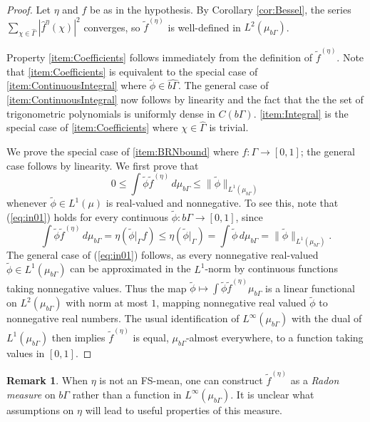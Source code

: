\documentclass[12pt]{amsart} \usepackage{amsmath,centernot,amssymb,leftindex}
\numberwithin{theorem}{section}
\numberwithin{equation}{section}
\theoremstyle{definition}
\newtheorem{remark}[theorem]{Remark}
\begin{document}
	\begin{proof} Let $\eta$ and $f$ be as in the hypothesis.  By
	  Corollary \ref{cor:Bessel}, the series $\sum_{\chi\in\widehat{\Gamma}}|\hat{f}^{\eta}(\chi)|^{2}$ converges, so  $\tilde{f}^{(\eta)}$ is well-defined in $L^{2}(\mu_{b\Gamma})$.	
	  
	  Property \ref{item:Coefficients} follows immediately from the definition of $\tilde{f}^{(\eta)}$. Note that \ref{item:Coefficients} is equivalent to the special case of \ref{item:ContinuousIntegral} where $\tilde{\phi}\in \widehat{b\Gamma}$.  The general case of \ref{item:ContinuousIntegral} now follows by linearity and the fact that the the set of trigonometric polynomials is uniformly dense in $C(b\Gamma)$.  \ref{item:Integral} is the special case of \ref{item:Coefficients} where $\chi\in \widehat{\Gamma}$ is  trivial.
	
	
	
We prove the special case of  \ref{item:BRNbound} where $f:\Gamma \to [0,1]$;  the general case follows by linearity. We first prove that 
\begin{equation}\label{eq:in01}
0\leq \int \tilde{\phi} \tilde{f}^{(\eta)} \, d\mu_{b\Gamma}\leq \|\tilde{\phi}\|_{L^{1}(\mu_{b\Gamma})}
\end{equation} whenever $\tilde{\phi}\in L^{1}(\mu)$ is real-valued and nonnegative.   To see this, note that (\ref{eq:in01}) holds for every continuous $\tilde{\phi}:b\Gamma\to [0,1]$, since
\[
	\int \tilde{\phi} \tilde{f}^{(\eta)} \, d\mu_{b\Gamma}=\eta(\tilde{\phi}|_{\Gamma} f)\leq  \eta(\tilde{\phi}|_{\Gamma})=\int \tilde{\phi}\, d\mu_{b\Gamma} = \|\tilde{\phi}\|_{L^{1}(\mu_{b\Gamma})}.
\] 
The general case of (\ref{eq:in01}) follows, as every nonnegative real-valued $\tilde{\phi}\in L^{1}(\mu_{b\Gamma})$  can be approximated in the $L^{1}$-norm by continuous functions taking nonnegative values.  Thus the map $\tilde{\phi}\mapsto \int \tilde{\phi} \tilde{f}^{(\eta)} \mu_{b\Gamma}$ is a linear functional on $L^{2}(\mu_{b\Gamma})$ with norm at most $1$, mapping nonnegative real valued $\tilde{\phi}$ to nonnegative real numbers. The usual identification of $L^{\infty}(\mu_{b\Gamma})$ with the dual of $L^{1}(\mu_{b\Gamma})$ then implies $\tilde{f}^{(\eta)}$ is equal, $\mu_{b\Gamma}$-almost everywhere, to a function taking values in $[0,1]$.
\end{proof}

\begin{remark}
	When $\eta$ is not an FS-mean, one can construct $\tilde{f}^{(\eta)}$ as a \emph{Radon measure} on $b\Gamma$ rather than a function in $L^\infty(\mu_{b\Gamma})$.  It is unclear what assumptions on $\eta$ will lead to useful properties of this measure.  
\end{remark}
\end{document}
